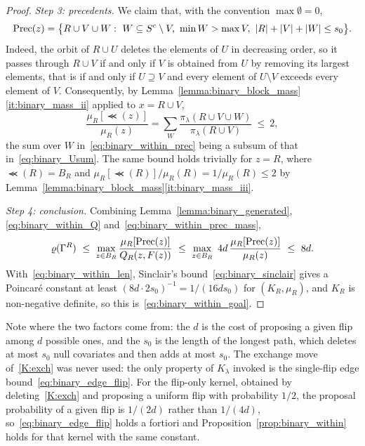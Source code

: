 \documentclass[aos]{imsart}%
\DeclarePairedDelimiter{\abs}{\lvert}{\rvert}
\theoremstyle{plain}
\theoremstyle{definition}
\begin{document}
\begin{proof}
        \emph{Step 3: precedents.} We claim that, with the convention
        $\max\emptyset=0$,
        \begin{equation}
            \label{eq:binary_within_prec}
            \Prec(z)=\bigl\{R\cup V\cup W:\ W\subseteq S^{c}\setminus V,\
            \min W>\max V,\ \abs R+\abs V+\abs W\leq s_0\bigr\}.
        \end{equation}
        Indeed, the orbit of $R\cup U$ deletes the elements of $U$ in
        decreasing order, so it passes through $R\cup V$ if and only if $V$ is
        obtained from $U$ by removing its largest elements, that is if and only
        if $U\supseteq V$ and every element of $U\setminus V$ exceeds every
        element of $V$. Consequently, by
        Lemma~\ref{lemma:binary_block_mass}\ref{it:binary_mass_ii} applied to
        $x=R\cup V$,
        \begin{equation}
            \label{eq:binary_within_prec_mass}
            \frac{\mu_R[\Prec(z)]}{\mu_R(z)}
            =\sum_{W}\frac{\pi_\lambda(R\cup V\cup W)}{\pi_\lambda(R\cup V)}
            \ \leq\ 2 ,
        \end{equation}
        the sum over $W$ in~\eqref{eq:binary_within_prec} being a subsum of
        that in~\eqref{eq:binary_Usum}. The same bound holds trivially for
        $z=R$, where $\Prec(R)=B_R$ and
        $\mu_R[\Prec(R)]/\mu_R(R)=1/\mu_R(R)\leq2$ by
        Lemma~\ref{lemma:binary_block_mass}\ref{it:binary_mass_iii}.

        \emph{Step 4: conclusion.} Combining
        Lemma~\ref{lemma:binary_generated}, \eqref{eq:binary_within_Q}
        and~\eqref{eq:binary_within_prec_mass},
        \begin{equation*}
            \varrho(\Gamma^{R})\ \leq\ \max_{z\in B_R}
            \frac{\mu_R[\mathrm{Prec}(z)]}{Q_R(z,F(z))}
            \ \leq\ \max_{z\in B_R}\ 4d\,
            \frac{\mu_R[\mathrm{Prec}(z)]}{\mu_R(z)}\ \leq\ 8d .
        \end{equation*}
        With~\eqref{eq:binary_within_len}, Sinclair's
        bound~\eqref{eq:binary_sinclair} gives a Poincar\'e constant at least
        $(8d\cdot2s_0)^{-1}=1/(16ds_0)$ for $(K_R,\mu_R)$, and $K_R$ is
        non-negative definite, so this is~\eqref{eq:binary_within_goal}.
    \end{proof}

    Note where the two factors come from: the $d$ is the cost of proposing a
    given flip among $d$ possible ones, and the $s_0$ is the length of the
    longest path, which deletes at most $s_0$ null covariates and then adds at
    most $s_0$. The exchange move of~\ref{K:exch} was never used: the only
    property of $K_\lambda$ invoked is the single-flip edge
    bound~\eqref{eq:binary_edge_flip}. For the flip-only kernel, obtained by
    deleting~\ref{K:exch} and proposing a uniform flip with probability
    $1/2$, the proposal probability of a given flip is $1/(2d)$ rather than
    $1/(4d)$, so~\eqref{eq:binary_edge_flip} holds a fortiori and
    Proposition~\ref{prop:binary_within} holds for that kernel with the same
    constant.
\end{document}
